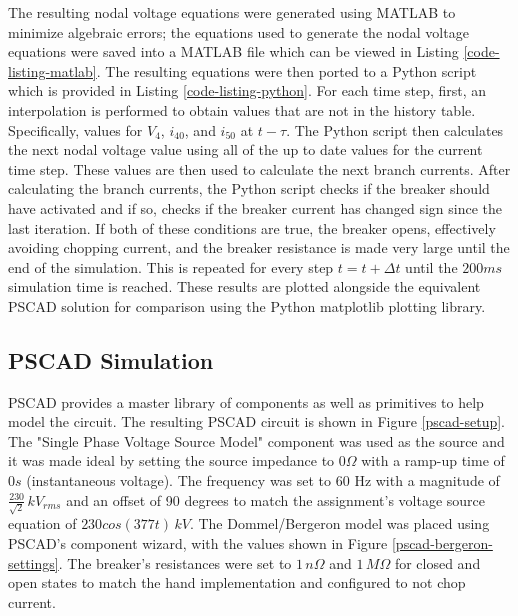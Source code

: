 \documentclass[10pt, oneside, letterpaper]{article}
\begin{document}
The resulting nodal voltage equations were generated using MATLAB to minimize algebraic errors; the equations used to generate the nodal voltage equations were saved into a MATLAB file which can be viewed in Listing \ref{code-listing-matlab}. The resulting equations were then ported to a Python script which is provided in Listing \ref{code-listing-python}. For each time step, first, an interpolation is performed to obtain values that are not in the history table. Specifically, values for $V_4$, $i_{40}$, and $i_{50}$ at $t - \tau$. The Python script then calculates the next nodal voltage value using all of the up to date values for the current time step. These values are then used to calculate the next branch currents. After calculating the branch currents, the Python script checks if the breaker should have activated and if so, checks if the breaker current has changed sign since the last iteration. If both of these conditions are true, the breaker opens, effectively avoiding chopping current, and the breaker resistance is made very large until the end of the simulation. This is repeated for every step $t = t + \Delta{}t$ until the $200 ms$ simulation time is reached. These results are plotted alongside the equivalent PSCAD solution for comparison using the Python matplotlib plotting library.

\subsection{PSCAD Simulation}

PSCAD provides a master library of components as well as primitives to help model the circuit. The resulting PSCAD circuit is shown in Figure \ref{pscad-setup}. The "Single Phase Voltage Source Model" component was used as the source and it was made ideal by setting the source impedance to $0 \Omega{}$ with a ramp-up time of $0 s$ (instantaneous voltage). The frequency was set to 60 Hz with a magnitude of $\frac{230}{\sqrt{2}}\,kV_{rms}$ and an offset of 90 degrees to match the assignment's voltage source equation of $230cos(377t)\,kV$. The Dommel/Bergeron model was placed using PSCAD's component wizard, with the values shown in Figure \ref{pscad-bergeron-settings}. The breaker's resistances were set to $1\,n\Omega$ and $1\,M\Omega$ for closed and open states to match the hand implementation and configured to not chop current.
\end{document}
